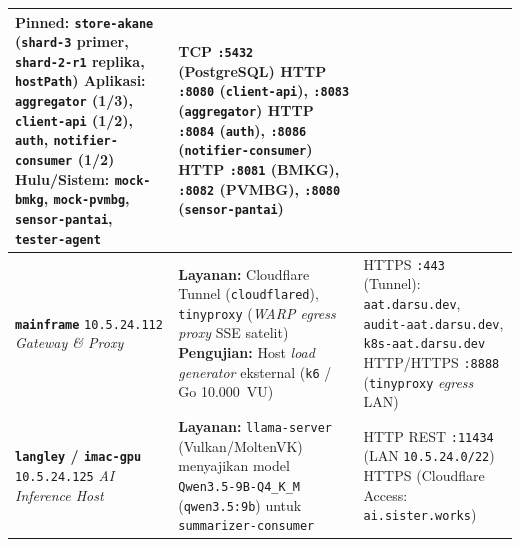 {\begin{spacing}{1.05}
\begin{xltabular}{\textwidth}{>{\raggedright\arraybackslash}p{2.8cm} >{\raggedright\arraybackslash}X >{\raggedright\arraybackslash}p{5.6cm}}
\textbf{Pinned:} \texttt{store-akane} (\texttt{shard-3} primer, \texttt{shard-2-r1} replika, \texttt{hostPath}) \newline
\textbf{Aplikasi:} \texttt{aggregator} (1/3), \texttt{client-api} (1/2), \texttt{auth}, \texttt{notifier-consumer} (1/2) \newline
\textbf{Hulu/Sistem:} \texttt{mock-bmkg}, \texttt{mock-pvmbg}, \texttt{sensor-pantai}, \texttt{tester-agent} &
TCP \texttt{:5432} (PostgreSQL) \newline
HTTP \texttt{:8080} (\texttt{client-api}), \texttt{:8083} (\texttt{aggregator}) \newline
HTTP \texttt{:8084} (\texttt{auth}), \texttt{:8086} (\texttt{notifier-consumer}) \newline
HTTP \texttt{:8081} (BMKG), \texttt{:8082} (PVMBG), \texttt{:8080} (\texttt{sensor-pantai}) \\
\midrule
\textbf{\texttt{mainframe}} \newline \texttt{10.5.24.112} \newline \textit{Gateway \& Proxy} &
\textbf{Layanan:} Cloudflare Tunnel (\texttt{cloudflared}), \texttt{tinyproxy} (\textit{WARP egress proxy} SSE satelit) \newline
\textbf{Pengujian:} Host \textit{load generator} eksternal (\texttt{k6} / Go 10.000~VU) &
HTTPS \texttt{:443} (Tunnel): \texttt{aat.darsu.dev}, \texttt{audit-aat.darsu.dev}, \texttt{k8s-aat.darsu.dev} \newline
HTTP/HTTPS \texttt{:8888} (\texttt{tinyproxy} \textit{egress} LAN) \\
\midrule
\textbf{\texttt{langley} / \texttt{imac-gpu}} \newline \texttt{10.5.24.125} \newline \textit{AI Inference Host} &
\textbf{Layanan:} \texttt{llama-server} (Vulkan/\allowbreak MoltenVK) menyajikan model \texttt{Qwen3.5-9B-\allowbreak Q4\_K\_M} (\texttt{qwen3.5:9b}) untuk \texttt{summarizer-consumer} &
HTTP REST \texttt{:11434} (LAN \texttt{10.5.24.0/22}) \newline
HTTPS (Cloudflare Access: \texttt{ai.sister.works}) \\
\end{xltabular}
\end{spacing}
}
